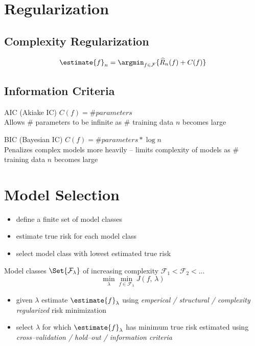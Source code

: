 \documentclass[18pt,a3paper,landscape, ncols=3]{cheatsheet}
\begin{document}
\section{Regularization} \seperator
	\subsection{Complexity Regularization}
		\begin{mdframed}
			\[
				\estimate{f}_{n} = \argmin_{f \in \mathcal{F}} \lbrace \widehat{R}_{n}(f) + C(f) \rbrace
			\]
		\end{mdframed}
	\subsection{Information Criteria}
		\begin{mdframed}
			AIC (Akiake IC) \quad \(C(f) = \# parameters\)\\
			\indent Allows \(\#\) parameters to be infinite as \(\#\) training data \(n\) becomes large
		\end{mdframed}
		\begin{mdframed}
			BIC (Bayesian IC) \quad \(C(f) = \# parameters * \log n\)\\
			\indent Penalizes complex models more heavily -- limits complexity of models as \(\#\) training data \(n\) becomes large
		\end{mdframed}

\section{Model Selection} \seperator
	\begin{mdframed}
		\begin{itemize}
			\item define a finite set of model classes
			\item estimate true risk for each model class
			\item select model class with lowest estimated true risk
		\end{itemize}
	\end{mdframed}
	\begin{mdframed}
		Model classes \(\Set{\mathcal{F}_{\lambda}}\) of increasing complexity \(\mathcal{F}_{1} < \mathcal{F}_{2} < \ldots\)
		\[\min_{\lambda} \min_{f \in \mathcal{F}_{\lambda}} J(f,\, \lambda)\]
		\begin{itemize}
			\item given \(\lambda\) estimate \(\estimate{f}_{\lambda}\) using \textit{emperical / structural / complexity regularized} risk minimization
			\item select \(\lambda\) for which \(\estimate{f}_{\lambda}\) has minimum true risk estimated using \textit{cross--validation / hold--out / information criteria}
		\end{itemize}
	\end{mdframed}
\end{document}
